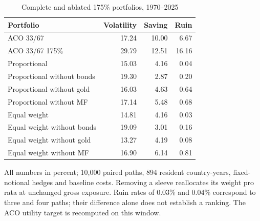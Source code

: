 \begin{table}[htbp]\centering\small
\caption{Complete and ablated 175\% portfolios, 1970--2025}\label{tab:review-post1970}
\begin{tabular}{lrrr}\toprule
Portfolio & Volatility & Saving & Ruin \\
\midrule
ACO 33/67 & 17.24 & 10.00 & 6.67 \\
ACO 33/67 175\% & 29.79 & 12.51 & 16.16 \\
Proportional & 15.03 & 4.16 & 0.04 \\
Proportional without bonds & 19.30 & 2.87 & 0.20 \\
Proportional without gold & 16.03 & 4.63 & 0.64 \\
Proportional without MF & 17.14 & 5.48 & 0.68 \\
Equal weight & 14.81 & 4.16 & 0.03 \\
Equal weight without bonds & 19.09 & 3.01 & 0.16 \\
Equal weight without gold & 13.27 & 4.19 & 0.08 \\
Equal weight without MF & 16.90 & 6.14 & 0.81 \\
\bottomrule\end{tabular}
\par\smallskip\begin{minipage}{0.96\textwidth}\footnotesize
All numbers in percent; 10,000 paired paths, 894 resident country-years, fixed-notional hedges and baseline costs. Removing a sleeve reallocates its weight pro rata at unchanged gross exposure. Ruin rates of 0.03\% and 0.04\% correspond to three and four paths; their difference alone does not establish a ranking. The ACO utility target is recomputed on this window.
\end{minipage}\end{table}
